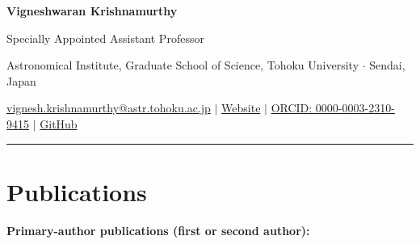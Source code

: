 \documentclass[10pt,a4paper]{article}
\begin{document}
\thispagestyle{empty}
{\fontsize{25}{28}\selectfont\sffamily\bfseries\color{navy} Vigneshwaran Krishnamurthy}\par
\vspace{2pt}
{\large\sffamily\color{teal}Specially Appointed Assistant Professor}\par
{\small Astronomical Institute, Graduate School of Science, Tohoku University $\cdot$ Sendai, Japan}\par
\vspace{4pt}
{\small\sffamily
\href{mailto:vignesh.krishnamurthy@astr.tohoku.ac.jp}{vignesh.krishnamurthy@astr.tohoku.ac.jp}
\quad$\vert$\quad
\href{https://vigneshastro.github.io/}{Website}
\quad$\vert$\quad
\href{https://orcid.org/0000-0003-2310-9415}{ORCID: 0000-0003-2310-9415}
\quad$\vert$\quad
\href{https://github.com/VigneshAstro}{GitHub}}
\vspace{5pt}
\color{rulegray}\hrule\color{black}
\vspace{2pt}

\section{Publications}

\textbf{Primary-author publications (first or second author):}
\end{document}
